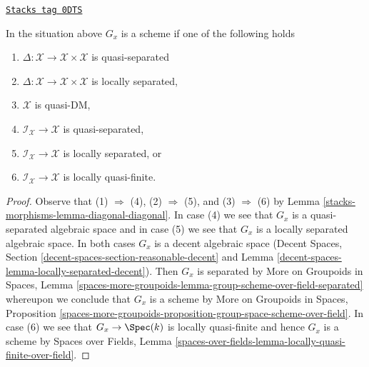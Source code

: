 \begin{lemma}
\label{stacks-morphisms-lemma-automorphism-group-scheme}
\href{https://stacks.math.columbia.edu/tag/0DTS}{\texttt{Stacks tag 0DTS}}

In the situation above $G_x$ is a scheme if one of the following
holds
\begin{enumerate}
\item $\Delta : \mathcal{X} \to \mathcal{X} \times \mathcal{X}$
is quasi-separated
\item $\Delta : \mathcal{X} \to \mathcal{X} \times \mathcal{X}$
is locally separated,
\item $\mathcal{X}$ is quasi-DM,
\item $\mathcal{I}_\mathcal{X} \to \mathcal{X}$
is quasi-separated,
\item $\mathcal{I}_\mathcal{X} \to \mathcal{X}$
is locally separated, or
\item $\mathcal{I}_\mathcal{X} \to \mathcal{X}$
is locally quasi-finite.
\end{enumerate}
\end{lemma}

\begin{proof}
Observe that (1) $\Rightarrow$ (4), (2) $\Rightarrow$ (5), and
(3) $\Rightarrow$ (6) by
Lemma \ref{stacks-morphisms-lemma-diagonal-diagonal}.
In case (4) we see that $G_x$ is a quasi-separated
algebraic space and in case (5) we see that $G_x$
is a locally separated algebraic space.
In both cases $G_x$ is a decent algebraic space
(Decent Spaces, Section \ref{decent-spaces-section-reasonable-decent} and
Lemma \ref{decent-spaces-lemma-locally-separated-decent}).
Then $G_x$ is separated by More on Groupoids in Spaces, Lemma
\ref{spaces-more-groupoids-lemma-group-scheme-over-field-separated}
whereupon we conclude that $G_x$ is a scheme by
More on Groupoids in Spaces, Proposition
\ref{spaces-more-groupoids-proposition-group-space-scheme-over-field}.
In case (6) we see that $G_x \to \Spec(k)$ is locally quasi-finite
and hence $G_x$ is a scheme by
Spaces over Fields, Lemma
\ref{spaces-over-fields-lemma-locally-quasi-finite-over-field}.
\end{proof}

